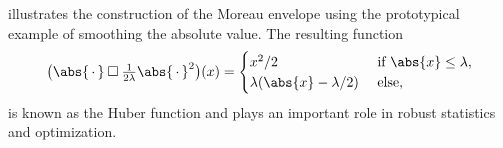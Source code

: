  illustrates the construction of the Moreau envelope using the prototypical example of smoothing the absolute value.
The resulting function
\begin{equation}
	\bigl(\InfConv{\abs{\argm}}{\tfrac{1}{2\lambda}\abs{\argm}^{\num{2}}}\bigr)(x) = \begin{cases}
		x^{\num{2}} / \num{2} & \text{ if } \abs{x} \leq \lambda, \\
		\lambda(\abs{x} - \lambda/\num{2}) & \text{ else},
	\end{cases}
	\label{eq:huber function}
\end{equation}
is known as the Huber function and plays an important role in robust statistics and optimization.
\begin{sidefigure}
	\caption[%
		The Moreau envelope of the absolute value%
	]{%
		Illustration of the Moreau envelope of the absolute value, leading to the Huber function.%
	}%
	\label{fig:moreau absolute value}
\end{sidefigure}

